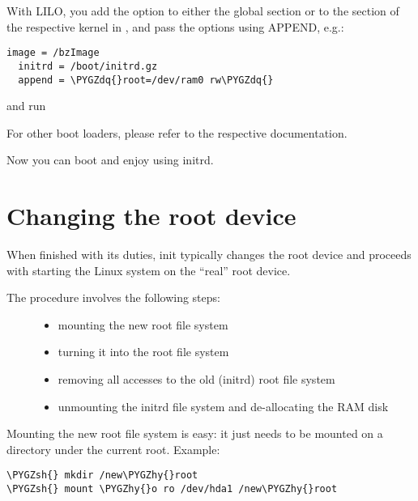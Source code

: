\documentclass[a4paper,8pt,english]{sphinxmanual}
\def\PYGZsh{\char`\#}
\def\PYGZhy{\char`\-}
\def\PYGZdq{\char`\"}
\begin{document}
With LILO, you add the option  to either the global section
or to the section of the respective kernel in , and pass
the options using APPEND, e.g.:

\begin{Verbatim}[commandchars=\\\{\}]
image = /bzImage
  initrd = /boot/initrd.gz
  append = \PYGZdq{}root=/dev/ram0 rw\PYGZdq{}
\end{Verbatim}

and run 

For other boot loaders, please refer to the respective documentation.

Now you can boot and enjoy using initrd.


\section{Changing the root device}
\label{admin-guide/initrd:changing-the-root-device}
When finished with its duties, init typically changes the root device
and proceeds with starting the Linux system on the ``real'' root device.
\begin{description}
\item[{The procedure involves the following steps:}] \leavevmode\begin{itemize}
\item {} 
mounting the new root file system

\item {} 
turning it into the root file system

\item {} 
removing all accesses to the old (initrd) root file system

\item {} 
unmounting the initrd file system and de-allocating the RAM disk

\end{itemize}

\end{description}

Mounting the new root file system is easy: it just needs to be mounted on
a directory under the current root. Example:

\begin{Verbatim}[commandchars=\\\{\}]
\PYGZsh{} mkdir /new\PYGZhy{}root
\PYGZsh{} mount \PYGZhy{}o ro /dev/hda1 /new\PYGZhy{}root
\end{Verbatim}
\end{document}

